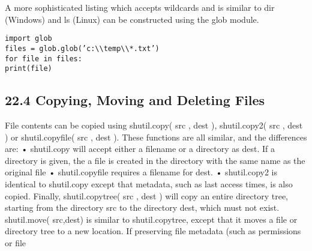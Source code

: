 A more sophisticated listing which accepts wildcards and is similar to dir (Windows) and ls (Linux)
can be constructed using the glob module.
\begin{framed}
\begin{verbatim}
import glob
files = glob.glob(’c:\\temp\\*.txt’)
for file in files:
print(file)
\end{verbatim}
\end{framed}
\subsection{22.4 Copying, Moving and Deleting Files}
File contents can be copied using shutil.copy( src , dest ), shutil.copy2( src , dest ) or shutil.copyfile(
src , dest ). These functions are all similar, and the differences are:
• shutil.copy will accept either a filename or a directory as dest. If a directory is given, the a file is
created in the directory with the same name as the original file
• shutil.copyfile requires a filename for dest.
• shutil.copy2 is identical to shutil.copy except that metadata, such as last access times, is also
copied.
Finally, shutil.copytree( src , dest ) will copy an entire directory tree, starting from the directory src to
the directory dest, which must not exist. shutil.move( src,dest) is similar to shutil.copytree, except that
it moves a file or directory tree to a new location. If preserving file metadata (such as permissions or file


